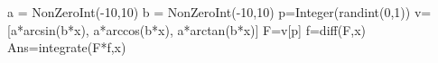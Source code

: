 

\begin{sagesilent}
a = NonZeroInt(-10,10)
b = NonZeroInt(-10,10)
p=Integer(randint(0,1))
v=[a*arcsin(b*x), a*arccos(b*x), a*arctan(b*x)]
F=v[p]
f=diff(F,x)
Ans=integrate(F*f,x)
\end{sagesilent}














































